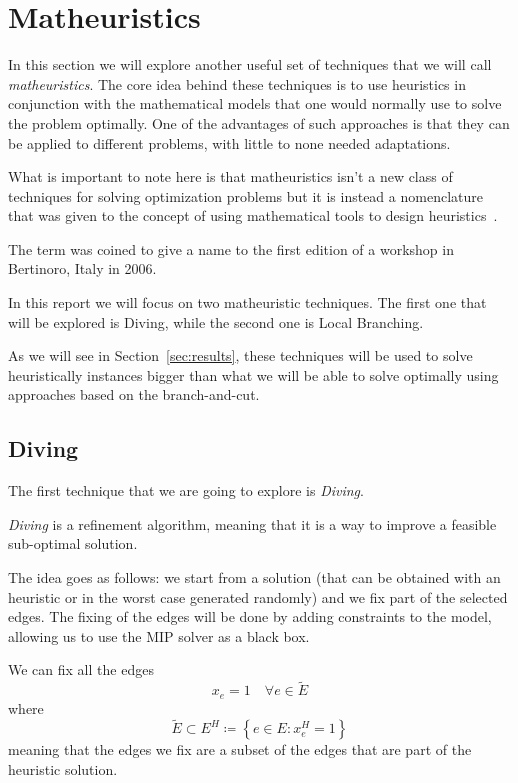 \documentclass{article}
\begin{document}
\newpage

\section{Matheuristics}
In this section we will explore another useful set of techniques that we will call
\textit{matheuristics}.
The core idea behind these techniques is to use heuristics in conjunction with the
mathematical models that one would normally use to solve the problem optimally.
One of the advantages of such approaches is that they can be applied to different problems,
with little to none needed adaptations.

What is important to note here is that matheuristics isn't a new class of techniques
for solving optimization problems but it is instead a nomenclature that was given
to the concept of using mathematical tools to design heuristics~\cite{boschetti2022matheuristics}.

The term was coined to give a name to the first edition of a workshop in Bertinoro, Italy
in 2006.

In this report we will focus on two matheuristic techniques.
The first one that will be explored is Diving, while the second one is Local Branching.

As we will see in Section~\ref{sec:results}, these techniques will be used to solve
heuristically instances bigger than what we will be able to solve optimally using approaches
based on the branch-and-cut.

\subsection{Diving}
The first technique that we are going to explore is \textit{Diving}.

\textit{Diving} is a refinement algorithm, meaning that it is a way to improve a feasible
sub-optimal solution.

The idea goes as follows: we start from a solution (that can be obtained with an heuristic or in
the worst case generated randomly) and we fix part of the selected edges. The fixing of the
edges will be done by adding constraints to the model, allowing us to use the MIP solver
as a black box.

We can fix all the edges
\begin{equation*}
  x_{e}=1 \quad \forall e \in \tilde{E}
\end{equation*}
where
\begin{equation*}
  \tilde{E} \subset E^{H} \coloneq \left\{ e \in E : x_{e}^{H} = 1 \right\}
\end{equation*}
meaning that the edges we fix are a subset of the edges that are part of the heuristic solution.
\end{document}
